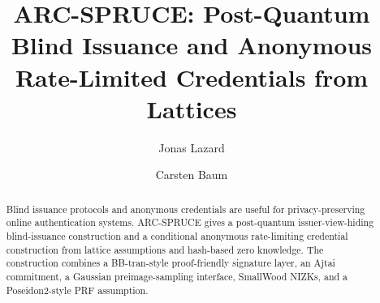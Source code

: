 \documentclass[sigconf]{acmart}
\title{ARC-SPRUCE: Post-Quantum Blind Issuance and Anonymous Rate-Limited Credentials from Lattices}
\author{Jonas Lazard}
\affiliation{%
  \institution{DTU Compute}
  \city{Kongens Lyngby}
  \country{Denmark}
}
\author{Carsten Baum}
\affiliation{%
  \institution{DTU Compute}
  \city{Kongens Lyngby}
  \country{Denmark}
}
\begin{document}
\begin{abstract}
Blind issuance protocols and anonymous credentials are useful for privacy-preserving online authentication
systems.  ARC-SPRUCE gives a post-quantum issuer-view-hiding blind-issuance construction and a conditional
anonymous rate-limiting credential construction from lattice assumptions and hash-based zero knowledge.  The
construction combines a BB-tran-style proof-friendly signature layer, an Ajtai commitment, a Gaussian
preimage-sampling interface, SmallWood NIZKs, and a Poseidon2-style PRF assumption.
\end{abstract}

\maketitle








\appendix








\end{document}

